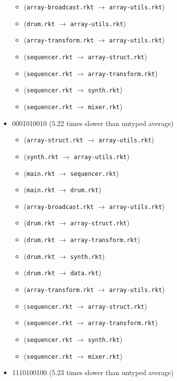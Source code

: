 \documentclass{article}
\newcommand{\mono}[1]{\texttt{#1}}
\begin{document}
\begin{itemize}
\begin{itemize}
  \item (\mono{array-broadcast.rkt} $\rightarrow$ \mono{array-utils.rkt})
  \item (\mono{drum.rkt} $\rightarrow$ \mono{array-utils.rkt})
  \item (\mono{array-transform.rkt} $\rightarrow$ \mono{array-utils.rkt})
  \item (\mono{sequencer.rkt} $\rightarrow$ \mono{array-struct.rkt})
  \item (\mono{sequencer.rkt} $\rightarrow$ \mono{array-transform.rkt})
  \item (\mono{sequencer.rkt} $\rightarrow$ \mono{synth.rkt})
  \item (\mono{sequencer.rkt} $\rightarrow$ \mono{mixer.rkt})
  \end{itemize}
\item 0001010010 (5.22 times slower than untyped average)
  \begin{itemize}
  \item (\mono{array-struct.rkt} $\rightarrow$ \mono{array-utils.rkt})
  \item (\mono{synth.rkt} $\rightarrow$ \mono{array-utils.rkt})
  \item (\mono{main.rkt} $\rightarrow$ \mono{sequencer.rkt})
  \item (\mono{main.rkt} $\rightarrow$ \mono{drum.rkt})
  \item (\mono{array-broadcast.rkt} $\rightarrow$ \mono{array-utils.rkt})
  \item (\mono{drum.rkt} $\rightarrow$ \mono{array-struct.rkt})
  \item (\mono{drum.rkt} $\rightarrow$ \mono{array-transform.rkt})
  \item (\mono{drum.rkt} $\rightarrow$ \mono{synth.rkt})
  \item (\mono{drum.rkt} $\rightarrow$ \mono{data.rkt})
  \item (\mono{array-transform.rkt} $\rightarrow$ \mono{array-utils.rkt})
  \item (\mono{sequencer.rkt} $\rightarrow$ \mono{array-struct.rkt})
  \item (\mono{sequencer.rkt} $\rightarrow$ \mono{array-transform.rkt})
  \item (\mono{sequencer.rkt} $\rightarrow$ \mono{synth.rkt})
  \item (\mono{sequencer.rkt} $\rightarrow$ \mono{mixer.rkt})
  \end{itemize}
\item 1110100100 (5.23 times slower than untyped average)
  \begin{itemize}

\end{itemize}
\end{itemize}
\end{document}

